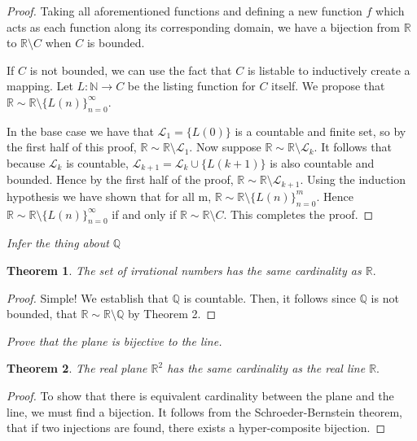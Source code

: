 \documentclass[letter]{article}
\newtheorem{theorem}{Theorem}
\newenvironment{menumerate}{%
  \edef\backupindent{\the\parindent}%
  \enumerate%
  \setlength{\parindent}{\backupindent}%
}{\endenumerate}
\begin{document}
\begin{menumerate}
\begin{menumerate}
\begin{proof}
 			 		 Taking all aforementioned functions and defining a new function $f$ which acts as each function along its corresponding domain, we have a bijection from $\mathbb{R}$ to $\mathbb{R}\setminus C$ when $C$ is bounded. 

 			 		 If $C$ is not bounded, we can use the fact that $C$ is listable to inductively create a mapping. Let $L:\mathbb{N}\to C$ be the listing function for $C$ itself. We propose that $\mathbb{R} \sim \mathbb{R} \setminus \{L(n)\}_{n=0}^\infty$.

 			 		 In the base case we have that $\mathcal{L}_1 = \{L(0)\}$ is a countable and finite set, so by the first half of this proof, $\mathbb{R} \sim \mathbb{R} \setminus \mathcal{L}_1.$ Now suppose $\mathbb{R} \sim \mathbb{R} \setminus \mathcal{L}_k.$ It follows that because $\mathcal{L}_k$ is countable, $\mathcal{L}_{k+1} = \mathcal{L}_k \cup \{L(k+1)\}$ is also countable and bounded. Hence by the first half of the proof, $\mathbb{R} \sim \mathbb{R} \setminus \mathcal{L}_{k+1}$.
					 Using the induction hypothesis we have shown that for all m, $\mathbb{R} \sim \mathbb{R} \setminus \{L(n)\}_{n=0}^m$. Hence $\mathbb{R} \sim \mathbb{R} \setminus \{L(n)\}_{n=0}^\infty$ if and only if  $\mathbb{R} \sim \mathbb{R} \setminus C$. This completes the proof.

	 		  \end{proof}

	 		  \item \textit{Infer the thing about $\mathbb{Q}$ } 
	 		  	\begin{theorem}
	 		  		The set of irrational numbers has the same cardinality as $\mathbb{R}.$
	 		  	\end{theorem}
	 		  	\begin{proof}
	 		  	Simple! We establish that $\mathbb{Q}$ is countable. Then, it follows since $\mathbb{Q}$ is not bounded, that $\mathbb{R} \sim \mathbb{R} \setminus \mathbb{Q}$ by Theorem 2.
	 		  	\end{proof}
		 \end{menumerate} 
		 \item \textit{Prove that the plane is bijective to the line.}
		 	\begin{theorem}
		 		The real plane $\mathbb{R}^2$ has the same cardinality as the real line $\mathbb{R}.$
		 	\end{theorem}
		 	\begin{proof}
		 		To show that there is equivalent cardinality between the plane and the line, we must find a bijection. It follows from the Schroeder-Bernstein theorem, that if two injections are found, there exists a hyper-composite bijection.
		 	\end{proof}

\end{menumerate}
\end{document}
